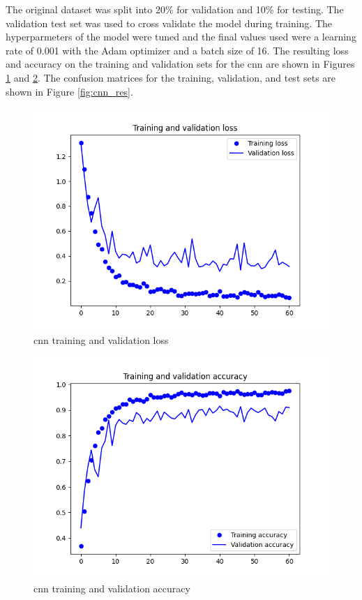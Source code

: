 \documentclass[10pt,twocolumn,letterpaper]{article}
\begin{document}
The original dataset was split into 20\% for validation and 10\% for testing. The validation test set was used to cross validate the model during training. The hyperparmeters of the model were tuned and the final values used were a learning rate of 0.001 with the Adam optimizer and a batch size of 16.  The resulting loss and accuracy on the training and validation sets for the \acrshort{cnn} are shown in Figures \ref{fig:cnn_loss} and \ref{fig:cnn_accuracy}. The confusion matrices for the training, validation, and test sets are shown in Figure \ref{fig:cnn_res}.

\begin{figure}[H]
  \centering
   \includegraphics[width=0.9\linewidth, trim={3em, 2em, 4em, 4em}, clip]{cnn_loss}
   \caption{\acrshort{cnn} training and validation loss}
   \label{fig:cnn_loss}
\end{figure}

\begin{figure}[H]
  \centering
   \includegraphics[width=0.9\linewidth, trim={3em, 2em, 4em, 4em}, clip]{cnn_accuracy}
   \caption{\acrshort{cnn} training and validation accuracy}
   \label{fig:cnn_accuracy}
\end{figure}
\end{document}
